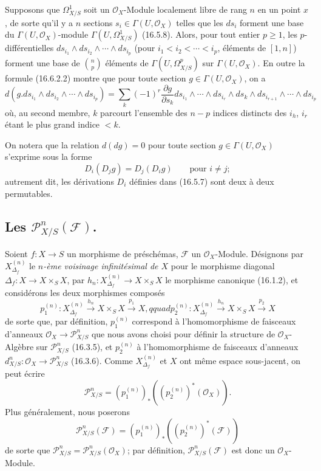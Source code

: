 \begin{env}[16.6.5]
\label{IV.16.6.5}
Supposons que $\Omega_{X/S}^1$ soit un $\mathcal{O}_X$-Module localement libre
de rang $n$ en un point $x$, de sorte qu'il y a $n$ sections
$s_i\in\Gamma(U,\mathcal{O}_X)$ telles que les $ds_i$ forment une base du
$\Gamma(U,\mathcal{O}_X)$-module $\Gamma(U,\Omega_{X/S}^1)$ (16.5.8).
Alors, pour tout entier $p\geq1$, les $p$-différentielles
$ds_{i_1}\wedge ds_{i_2}\wedge\cdots\wedge ds_{i_p}$ (pour
$i_1<i_2<\cdots<i_p$, éléments de $[1,n]$) forment une base de
$\binom{n}{p}$ éléments de $\Gamma(U,\Omega_{X/S}^p)$ sur
$\Gamma(U,\mathcal{O}_X)$. En outre la formule (16.6.2.2) montre que pour
toute section $g\in\Gamma(U,\mathcal{O}_X)$, on a
\[
  d(g.ds_{i_1}\wedge ds_{i_2}\wedge\cdots\wedge ds_{i_p})
  =\sum_k(-1)^r\frac{\partial g}{\partial s_k}
  ds_{i_1}\wedge\cdots\wedge ds_{i_r}\wedge ds_k\wedge
  ds_{i_{r+1}}\wedge\cdots\wedge ds_{i_p}
  \tag{16.6.5.1}
  \label{IV.16.6.5.1}
\]
où, au second membre, $k$ parcourt l'ensemble des $n-p$ indices distincts des
$i_h$, $i_r$ étant le plus grand indice $<k$.

On notera que la relation $d(dg)=0$ pour toute section
$g\in\Gamma(U,\mathcal{O}_X)$ s'exprime sous la forme
\[
  D_i(D_jg)=D_j(D_ig)\qquad\text{pour $i\neq j$};
\]
autrement dit, les dérivations $D_i$ définies dans (16.5.7) sont deux à deux
permutables.
\end{env}

\subsection{Les $\mathscr{P}_{X/S}^n(\mathscr{F})$.}
\label{IV.16.7}

\begin{env}[16.7.1]
\label{IV.16.7.1}
Soient $f:X\to S$ un morphisme de préschémas, $\mathscr{F}$ un
$\mathcal{O}_X$-Module. Désignons par $X_{\Delta_f}^{(n)}$ le \emph{$n$-ème
voisinage infinitésimal de $X$} pour le morphisme diagonal
$\Delta_f:X\to X\times_S X$, par
$h_n:X_{\Delta_f}^{(n)}\to X\times_S X$ le morphisme canonique (16.1.2), et
considérons les deux morphismes composés
\[
  p_1^{(n)}:X_{\Delta_f}^{(n)}\xrightarrow{h_n}X\times_S X
  \xrightarrow{p_1}X,qquad
  p_2^{(n)}:X_{\Delta_f}^{(n)}\xrightarrow{h_n}X\times_S X
  \xrightarrow{p_2}X
\]
de sorte que, par définition, $p_1^{(n)}$ correspond à l'homomorphisme de
faisceaux d'anneaux $\mathcal{O}_X\to\mathscr{P}_{X/S}^n$ que nous avons
choisi pour définir la structure de $\mathcal{O}_X$-Algèbre sur
$\mathscr{P}_{X/S}^n$ (16.3.5), et $p_2^{(n)}$ à l'homomorphisme de faisceaux
d'anneaux $d_{X/S}^n:\mathcal{O}_X\to\mathscr{P}_{X/S}^n$ (16.3.6). Comme
$X_{\Delta_f}^{(n)}$ et $X$ ont même espace sous-jacent, on peut écrire
\[
  \mathscr{P}_{X/S}^n
  =(p_1^{(n)})_*((p_2^{(n)})^*(\mathcal{O}_X)).
  \tag{16.7.1.1}
  \label{IV.16.7.1.1}
\]
Plus généralement, nous poserons
\[
  \mathscr{P}_{X/S}^n(\mathscr{F})
  =(p_1^{(n)})_*((p_2^{(n)})^*(\mathscr{F}))
  \tag{16.7.1.2}
  \label{IV.16.7.1.2}
\]
de sorte que
$\mathscr{P}_{X/S}^n=\mathscr{P}_{X/S}^n(\mathcal{O}_X)$; par définition,
$\mathscr{P}_{X/S}^n(\mathscr{F})$ est donc un $\mathcal{O}_X$-Module.
\end{env}

